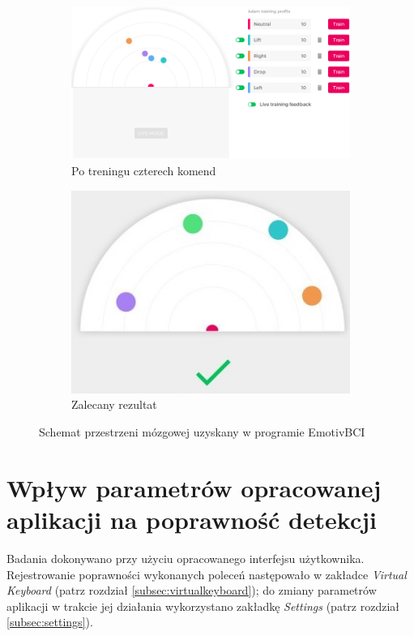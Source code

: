 \documentclass[skorowidz,skroty]{dyplomWEZUT}
\begin{document}
\begin{figure}[htb]
    \medskip
    \begin{subfigure}{0.49\textwidth}
    \includegraphics[width=\linewidth]{graphic/4commands}
    \caption{Po treningu czterech komend\label{fig:brainmap_four}}
    \end{subfigure}\hspace*{\fill}
    \begin{subfigure}{0.49\textwidth}
    \includegraphics[width=\linewidth]{graphic/propercommands}
    \caption{Zalecany rezultat\label{fig:brainmap_recommended}}
    \end{subfigure}
    
    \caption{Schemat przestrzeni mózgowej uzyskany w programie EmotivBCI\label{fig:brainmap}}
\end{figure}


\section{Wpływ parametrów opracowanej aplikacji na poprawność detekcji\label{sec:parameter}}
Badania dokonywano przy użyciu opracowanego interfejsu użytkownika. Rejestrowanie poprawności wykonanych poleceń następowało w zakładce \textit{Virtual Keyboard} (patrz rozdział \vref{subsec:virtualkeyboard}); do zmiany parametrów aplikacji w trakcie jej działania wykorzystano zakładkę \textit{Settings} (patrz rozdział \vref{subsec:settings}).
\end{document}
